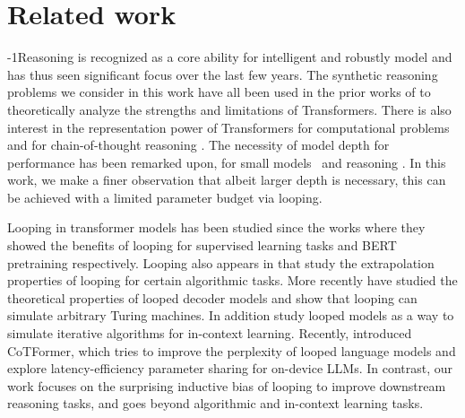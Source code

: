 \section{Related work}
\label{sec:related}
\vspace{-0.12in}

\looseness-1Reasoning is recognized as a core ability for intelligent and robustly model and has thus seen significant focus over the last few years. The synthetic reasoning problems we consider in this work have all been used in the prior works of \cite{sanford2024transformers,ye2024physics,sanford2024understanding,nogueira2021investigating} to theoretically analyze the strengths and limitations of Transformers.
There is also interest in the representation power of Transformers for computational problems \citep{liu2022transformers,strobl2023transformers} and for chain-of-thought reasoning \citep{merrill2023expresssive,feng2023towards,li2024chain}.
The necessity of model depth for performance has been remarked upon, for small models~\citep{liu2024mobilellm} and reasoning \citep{chen2024can,ye2024physics,petty2023impact}. In this work, we make a finer observation that albeit larger depth is necessary, this can be achieved with a limited parameter budget via looping. 

Looping in transformer models has been studied since the works \citep{dehghani2018universal,lan2019albert} where they showed the benefits of looping for supervised learning tasks and BERT pretraining respectively. 
Looping also appears in \citep{schwarzschild2021can,bansal2022end} that study the extrapolation properties of looping for certain algorithmic tasks.
More recently \citet{giannou2023looped,de2024simulation} have studied the theoretical properties of looped decoder models and show that looping can simulate arbitrary Turing machines. 
In addition \cite{yang2023looped,gao2024expressive,gatmiry2024can,gatmiry2024role} study looped models as a way to simulate iterative algorithms for in-context learning.
Recently, \citet{mohtashami2023cotformer} introduced CoTFormer, which tries to improve the perplexity of looped language models and \citep{liu2024mobilellm} explore latency-efficiency parameter sharing for on-device LLMs.
In contrast, our work focuses on the surprising inductive bias of looping to improve downstream reasoning tasks, and goes beyond algorithmic and in-context learning tasks.

